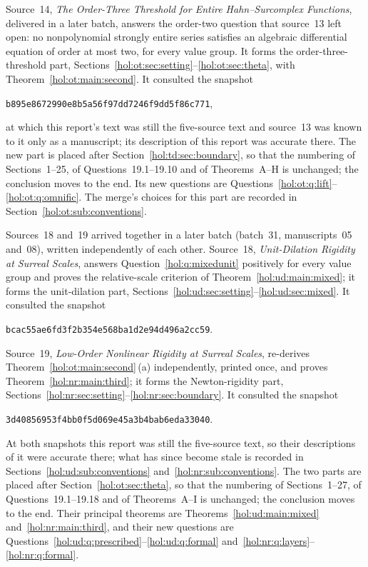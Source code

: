 \documentclass[11pt]{article}
\numberwithin{equation}{section}
\theoremstyle{definition}
\theoremstyle{remark}
\begin{document}
Source~14, \emph{The Order-Three Threshold for Entire Hahn--Surcomplex
Functions}, delivered in a later batch, answers the order-two question that
source~13 left open: no nonpolynomial strongly entire series satisfies an
algebraic differential equation of order at most two, for every value group.
It forms the order-three-threshold part,
Sections~\ref{hol:ot:sec:setting}--\ref{hol:ot:sec:theta}, with
Theorem~\ref{hol:ot:main:second}. It consulted the snapshot
\begin{center}\small\texttt{b895e8672990e8b5a56f97dd7246f9dd5f86c771},\end{center}
at which this report's text was still the five-source text and source~13 was
known to it only as a manuscript; its description of this report was accurate
there. The new part is placed after
Section~\ref{hol:td:sec:boundary}, so that the numbering of Sections~1--25, of
Questions~19.1--19.10 and of Theorems~A--H is unchanged; the conclusion moves
to the end. Its new questions are
Questions~\ref{hol:ot:q:lift}--\ref{hol:ot:q:omnific}. The merge's choices for
this part are recorded in Section~\ref{hol:ot:sub:conventions}.

Sources~18 and~19 arrived together in a later batch (batch~31, manuscripts~05
and~08), written independently of each other. Source~18, \emph{Unit-Dilation
Rigidity at Surreal Scales}, answers Question~\ref{hol:q:mixedunit}
positively for every value group and proves the relative-scale criterion of
Theorem~\ref{hol:ud:main:mixed}; it forms the unit-dilation part,
Sections~\ref{hol:ud:sec:setting}--\ref{hol:ud:sec:mixed}. It consulted the
snapshot
\begin{center}\small\texttt{bcac55ae6fd3f2b354e568ba1d2e94d496a2cc59}.\end{center}
Source~19, \emph{Low-Order Nonlinear Rigidity at Surreal Scales}, re-derives
Theorem~\ref{hol:ot:main:second}\,(a) independently, printed once, and proves
Theorem~\ref{hol:nr:main:third}; it forms the Newton-rigidity part,
Sections~\ref{hol:nr:sec:setting}--\ref{hol:nr:sec:boundary}. It consulted the
snapshot
\begin{center}\small\texttt{3d40856953f4bb0f5d069e45a3b4bab6eda33040}.\end{center}
At both snapshots this report was still the five-source text, so their
descriptions of it were accurate there; what has since become stale is
recorded in Sections~\ref{hol:ud:sub:conventions}
and~\ref{hol:nr:sub:conventions}. The two parts are placed after
Section~\ref{hol:ot:sec:theta}, so that the numbering of Sections~1--27, of
Questions~19.1--19.18 and of Theorems~A--I is unchanged; the conclusion moves
to the end. Their principal theorems are Theorems~\ref{hol:ud:main:mixed}
and~\ref{hol:nr:main:third}, and their new questions are
Questions~\ref{hol:ud:q:prescribed}--\ref{hol:ud:q:formal}
and~\ref{hol:nr:q:layers}--\ref{hol:nr:q:formal}.
\end{document}
